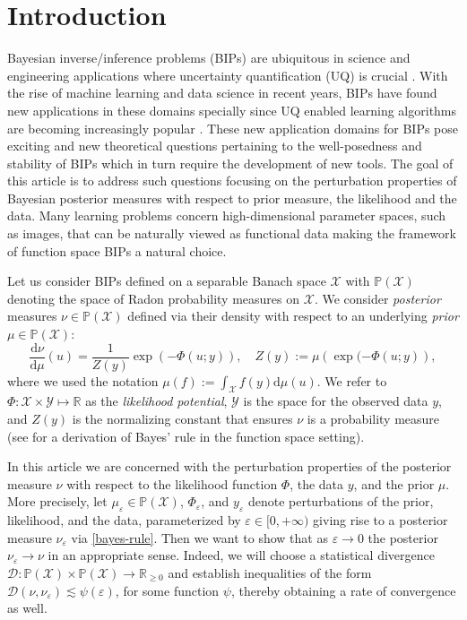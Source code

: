 \documentclass[final]{siamart171218}
\newcommand{\mcl}{\mathcal}
\newcommand{\mbb}{\mathbb}
\newcommand{\dd}{\text{d}}
\newcommand{\veps}{\varepsilon}
\newcommand{\R}{\mbb{R}}
\newcommand{\mX}{\mcl{X}}
\newcommand{\mY}{\mcl{Y}}
\newcommand{\PP}{\mbb{P}}
\newcommand{\D}{\mathcal{D}}
\begin{document}
\section{Introduction}
Bayesian inverse/inference problems (BIPs) are ubiquitous in science and engineering applications
where uncertainty quantification (UQ) is crucial \cite{le2010spectral}. With the rise of machine learning and
data science in recent years, BIPs have found new applications in these domains specially
since  UQ enabled learning algorithms are becoming increasingly popular 
\cite{abdar2021review, arridge2019solving, gonzalez2022solving, kovachki2020conditional, laumont2022bayesian, ongie2020deep, patel2022solution}.
These new application domains for BIPs pose exciting and new theoretical questions
pertaining to the well-posedness and stability of BIPs which in turn require the
development of new tools.
The goal of this article is to address such questions focusing on the perturbation
properties of Bayesian posterior measures with
respect to prior measure, the likelihood and the data. Many learning problems concern
high-dimensional parameter spaces, such as images, that can be naturally viewed as
functional data making the framework of function space BIPs a natural choice. 

Let us consider BIPs defined on a separable Banach space $\mX$
with $\PP(\mX)$ denoting the space of Radon probability measures on $\mX$. 
We consider  {\it posterior} measures $\nu \in \PP(\mX)$ 
defined via their density with respect to an underlying {\it prior} $\mu \in \PP(\mX)$:
  \begin{equation}\label{bayes-rule}
  \frac{\dd \nu}{\dd \mu}(u) = \frac{1}{Z(y)} \exp( - \Phi(u; y)), \quad
  Z(y) :=  \mu \left(  \exp(- \Phi(u;y) \right),
\end{equation}
where we used the notation $\mu(f) := \int_\mX f(y) \dd \mu(u)$. 
We refer to  $\Phi: \mX \times \mY \mapsto \mbb{R}$ as the {\it likelihood potential},
$\mY$ is the space for the observed data $y$, 
and $Z(y)$ is the normalizing constant  that ensures $\nu$ is a 
probability measure (see \cite{stuart-acta-numerica} for a derivation of
Bayes' rule in the function space setting).

In this article we are concerned with the perturbation properties of the posterior
measure $\nu$ with respect to the likelihood function $\Phi$,
 the data $y$, and the prior $\mu$. More precisely, let $\mu_\veps \in \PP(\mX)$, $\Phi_\veps$,
and $y_\veps$ denote perturbations of the prior, likelihood, and the data, parameterized
by  $\veps \in [0, +\infty)$ giving rise to a posterior measure $\nu_\veps$
via \eqref{bayes-rule}. Then we want to show that as $\veps \to 0$ the posterior $\nu_\veps \to \nu$
in an appropriate sense. Indeed, we will  choose a statistical divergence
$\D: \PP(\mX) \times \PP(\mX) \to \R_{\ge 0}$ and establish inequalities of the form
$\D(\nu, \nu_\veps) \lesssim \psi(\veps)$, for some function $\psi$, thereby obtaining a
rate of convergence as well. 
\end{document}
